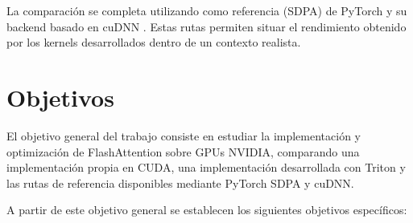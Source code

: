 La comparación se completa utilizando como referencia  (SDPA) de PyTorch \cite{pytorchSDPA} y su backend basado en cuDNN \cite{cudnnAttention}. Estas rutas permiten situar el rendimiento obtenido por los kernels desarrollados dentro de un contexto realista.

\section{Objetivos}

El objetivo general del trabajo consiste en estudiar la implementación y optimización de FlashAttention sobre GPUs NVIDIA, comparando una implementación propia en CUDA, una implementación desarrollada con Triton y las rutas de referencia disponibles mediante PyTorch SDPA y cuDNN.

A partir de este objetivo general se establecen los siguientes objetivos específicos:

